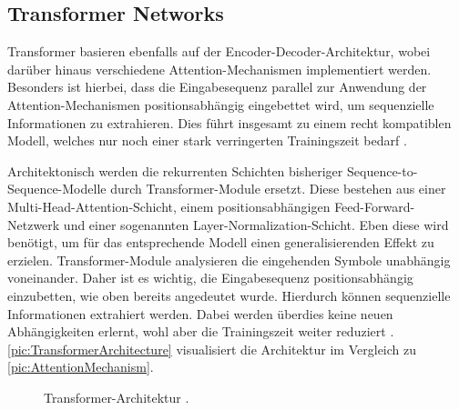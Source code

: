 \subsection{Transformer Networks}
\noindent
Transformer basieren ebenfalls auf der Encoder-Decoder-Architektur, wobei darüber hinaus verschiedene Attention-Mechanismen implementiert werden. Besonders ist hierbei, dass die Eingabesequenz parallel zur Anwendung der Attention-Mechanismen positionsabhängig eingebettet wird, um sequenzielle Informationen zu extrahieren. Dies führt insgesamt zu einem recht kompatiblen Modell, welches nur noch einer stark verringerten Trainingszeit bedarf \cite[S.~398]{ZHA20}.
\newpage

\noindent
Architektonisch werden die rekurrenten Schichten bisheriger Sequence-to-Sequence-Modelle durch Transformer-Module ersetzt. Diese bestehen aus einer Multi-Head-Attention-Schicht, einem positionsabhängigen Feed-Forward-Netzwerk und einer sogenannten Layer-Normalization-Schicht. Eben diese wird benötigt, um für das entsprechende Modell einen generalisierenden Effekt zu erzielen. Transformer-Module analysieren die eingehenden Symbole unabhängig voneinander. Daher ist es wichtig, die Eingabesequenz positionsabhängig einzubetten, wie oben bereits angedeutet wurde. Hierdurch können sequenzielle Informationen extrahiert werden. Dabei werden überdies keine neuen Abhängigkeiten erlernt, wohl aber die Trainingszeit weiter reduziert \cite[S.~399-404]{ZHA20}. \autoref{pic:TransformerArchitecture} visualisiert die Architektur im Vergleich zu \autoref{pic:AttentionMechanism}.\\

\begin{figure}[h!]
  \centering
  \caption{Transformer-Architektur \cite[S.~399]{ZHA20}.}
  \label{pic:TransformerArchitecture}
\end{figure}

